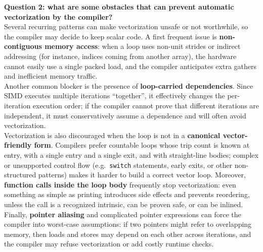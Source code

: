 \documentclass[unicode,10pt,a4paper,oneside,numbers=endperiod,openany]{scrartcl}
\begin{document}
\textbf{Question 2: what are some obstacles that can prevent automatic vectorization by the compiler?}\\
Several recurring patterns can make vectorization unsafe or not worthwhile, so the compiler may decide to keep scalar code. A first frequent issue is \textbf{non-contiguous memory access}: when a loop uses non-unit strides or indirect addressing (for instance, indices coming from another array), the hardware cannot easily use a single packed load, and the compiler anticipates extra gathers and inefficient memory traffic. \\
Another common blocker is the presence of \textbf{loop-carried dependencies}. Since SIMD executes multiple iterations ``together'', it effectively changes the per-iteration execution order; if the compiler cannot prove that different iterations are independent, it must conservatively assume a dependence and will often avoid vectorization.\\
Vectorization is also discouraged when the loop is not in a \textbf{canonical vector-friendly form}. Compilers prefer countable loops whose trip count is known at entry, with a single entry and a single exit, and with straight-line bodies; complex or unsupported control flow (e.g.\ \texttt{switch} statements, early exits, or other non-structured patterns) makes it harder to build a correct vector loop. Moreover, \textbf{function calls inside the loop body} frequently stop vectorization: even something as simple as printing introduces side effects and prevents reordering, unless the call is a recognized intrinsic, can be proven safe, or can be inlined.\\ Finally, \textbf{pointer aliasing} and complicated pointer expressions can force the compiler into worst-case assumptions: if two pointers might refer to overlapping memory, then loads and stores may depend on each other across iterations, and the compiler may refuse vectorization or add costly runtime checks.\\
\end{document}
